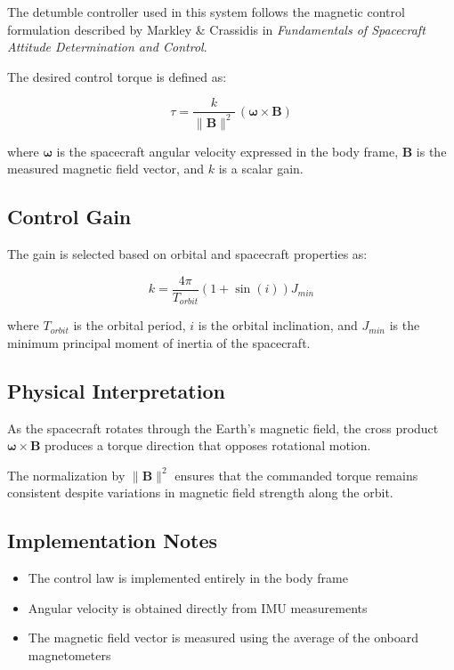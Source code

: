 The detumble controller used in this system follows the magnetic control formulation described by Markley \& Crassidis in \textit{Fundamentals of Spacecraft Attitude Determination and Control}.

The desired control torque is defined as:

\[
\tau = \frac{k}{\| \mathbf{B} \|^2} \, (\boldsymbol{\omega} \times \mathbf{B})
\]

where $\boldsymbol{\omega}$ is the spacecraft angular velocity expressed in the body frame, $\mathbf{B}$ is the measured magnetic field vector, and $k$ is a scalar gain.

\subsection{Control Gain}

The gain is selected based on orbital and spacecraft properties as:

\[
k = \frac{4\pi}{T_{orbit}} \left(1 + \sin(i)\right) J_{min}
\]

where $T_{orbit}$ is the orbital period, $i$ is the orbital inclination, and $J_{min}$ is the minimum principal moment of inertia of the spacecraft.

\subsection{Physical Interpretation}

As the spacecraft rotates through the Earth's magnetic field, the cross product $\boldsymbol{\omega} \times \mathbf{B}$ produces a torque direction that opposes rotational motion.

The normalization by $\| \mathbf{B} \|^2$ ensures that the commanded torque remains consistent despite variations in magnetic field strength along the orbit.

\subsection{Implementation Notes}

\begin{itemize}
	\item The control law is implemented entirely in the body frame
	\item Angular velocity is obtained directly from IMU measurements
	\item The magnetic field vector is measured using the average of the onboard magnetometers
\end{itemize}

